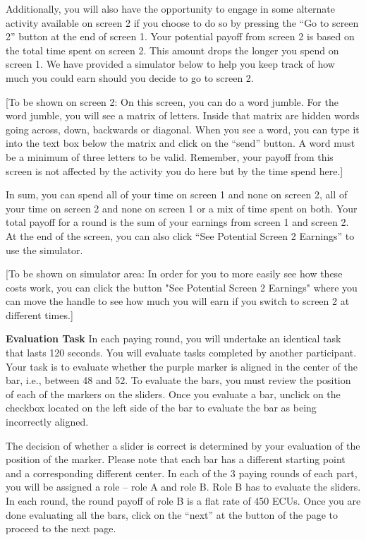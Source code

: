 Additionally, you will also have the opportunity to engage in some alternate activity available on screen 2 if you choose to do so by pressing the “Go to screen 2” button at the end of screen 1. Your potential payoff from screen 2 is based on the total time spent on screen 2. This amount drops the longer you spend on screen 1.  We have provided a simulator below to help you keep track of how much you could earn should you decide to go to screen 2. 

[To be shown on screen 2: On this screen, you can do a word jumble. For the word jumble, you will see a matrix of letters. Inside that matrix are hidden words going across, down, backwards or diagonal. When you see a word, you can type it into the text box below the matrix and click on the “send” button. A word must be a minimum of three letters to be valid. Remember, your payoff from this screen is not affected by the activity you do here but by the time spend here.]

In sum, you can spend all of your time on screen 1 and none on screen 2, all of your time on screen 2 and none on screen 1 or a mix of time spent on both. Your total payoff for a round is the sum of your earnings from screen 1 and screen 2. At the end of the screen, you can also click “See Potential Screen 2 Earnings” to use the simulator. 


[To be shown on simulator area: In order for you to more easily see how these costs work, you can click the button "See Potential Screen 2 Earnings" where you can move the handle to see how much you will earn if you switch to screen 2 at different times.]

\textbf{Evaluation Task}
\newline
In each paying round, you will undertake an identical task that lasts 120 seconds. You will evaluate tasks completed by another participant. Your task is to evaluate whether the purple marker is aligned in the center of the bar, i.e., between 48 and 52. To evaluate the bars, you must review the position of each of the markers on the sliders. Once you evaluate a bar, unclick on the checkbox located on the left side of the bar to evaluate the bar as being incorrectly aligned. 

The decision of whether a slider is correct is determined by your evaluation of the position of the marker. Please note that each bar has a different starting point and a corresponding different center.  In each of the 3 paying rounds of each part, you will be assigned a role – role A and role B. Role B has to evaluate the sliders.  In each round, the round payoff of role B is a flat rate of 450 ECUs. Once you are done evaluating all the bars, click on the “next” at the button of the page to proceed to the next page. 


